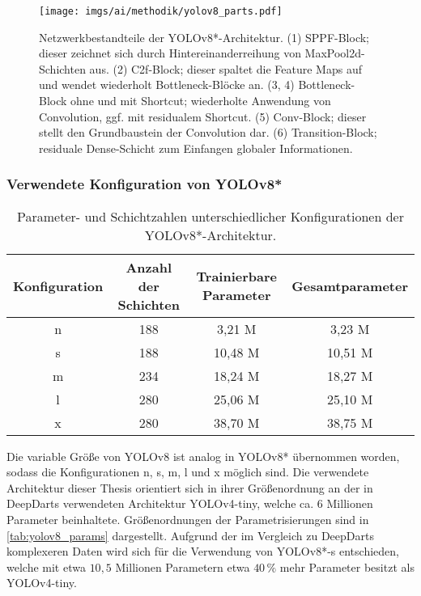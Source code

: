 \begin{figure}
    \centering
    \texttt{[image: imgs/ai/methodik/yolov8\_parts.pdf]}
    \caption{Netzwerkbestandteile der YOLOv8*-Architektur. (1) SPPF-Block; dieser zeichnet sich durch Hintereinanderreihung von MaxPool2d-Schichten aus. (2) C2f-Block; dieser spaltet die Feature Maps auf und wendet wiederholt Bottleneck-Blöcke an. (3, 4) Bottleneck-Block ohne und mit Shortcut; wiederholte Anwendung von Convolution, ggf. mit residualem Shortcut. (5) Conv-Block; dieser stellt den Grundbaustein der Convolution dar. (6) Transition-Block; residuale Dense-Schicht zum Einfangen globaler Informationen.}
    \label{img:yolov8_parts}
\end{figure}

\vspace*{-0.1cm}
\subsubsection{Verwendete Konfiguration von YOLOv8*}
\label{sec:yolov8_konfiguration}

\begin{table}[t]
    \begin{tabular}{c||c|c|c}
        Konfiguration & Anzahl der Schichten & Trainierbare Parameter & Gesamtparameter \\ \hline
        n             & 188                  & 3,21 M                 & 3,23 M          \\
        s             & 188                  & 10,48 M                & 10,51 M         \\
        m             & 234                  & 18,24 M                & 18,27 M         \\
        l             & 280                  & 25,06 M                & 25,10 M         \\
        x             & 280                  & 38,70 M                & 38,75 M
    \end{tabular}
    \caption{Parameter- und Schichtzahlen unterschiedlicher Konfigurationen der YOLOv8*-Architektur.}
    \label{tab:yolov8_params}
\end{table}

Die variable Größe von YOLOv8 ist analog in YOLOv8* übernommen worden, sodass die Konfigurationen n, s, m, l und x möglich sind. Die verwendete Architektur dieser Thesis orientiert sich in ihrer Größenordnung an der in DeepDarts verwendeten Architektur YOLOv4-tiny, welche ca. $6$ Millionen Parameter beinhaltete. Größenordnungen der Parametrisierungen sind in \autoref{tab:yolov8_params} dargestellt. Aufgrund der im Vergleich zu DeepDarts komplexeren Daten wird sich für die Verwendung von YOLOv8*-s entschieden, welche mit etwa $10,\!5$ Millionen Parametern etwa $40\,\%$ mehr Parameter besitzt als YOLOv4-tiny.

